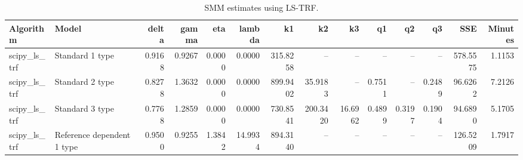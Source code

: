 \begin{table}
\caption{SMM estimates using LS-TRF.}
\label{tab:lstrf_estimates}
\begin{tabular}{llrrrrrrrrrrrr}
\toprule
Algorithm & Model & delta & gamma & eta & lambda & k1 & k2 & k3 & q1 & q2 & q3 & SSE & Minutes \\
\midrule
scipy_ls_trf & Standard 1 type & 0.9168 & 0.9267 & 0.0000 & 0.0000 & 315.8258 & -- & -- & -- & -- & -- & 578.5575 & 1.1153 \\
scipy_ls_trf & Standard 2 type & 0.8278 & 1.3632 & 0.0000 & 0.0000 & 899.9402 & 35.9183 & -- & 0.7511 & -- & 0.2489 & 96.6262 & 7.2126 \\
scipy_ls_trf & Standard 3 type & 0.7768 & 1.2859 & 0.0000 & 0.0000 & 730.8541 & 200.3420 & 16.6962 & 0.4899 & 0.3197 & 0.1904 & 94.6890 & 5.1705 \\
scipy_ls_trf & Reference dependent 1 type & 0.9500 & 0.9255 & 1.3842 & 14.9934 & 894.3140 & -- & -- & -- & -- & -- & 126.5209 & 1.7917 \\
\bottomrule
\end{tabular}
\end{table}
